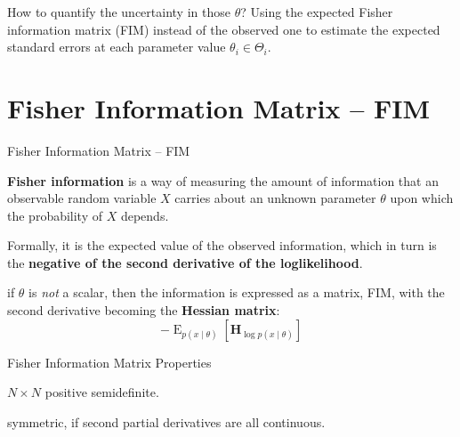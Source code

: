 \documentclass[aspectratio=169]{beamer}                    %
\begin{document}
\begin{frame}{How to quantify the uncertainty in those $\theta$?}
	Using the expected Fisher information matrix (FIM) instead of the
	observed one to estimate the expected standard errors at each parameter
	value $\theta_i \in \Theta_i$.
\end{frame}

\section{Fisher Information Matrix -- FIM}
\begin{frame}{Fisher Information Matrix -- FIM}
	\begin{vfilleditems}
		\item \textbf{Fisher information} is a way of measuring the amount of information that an observable
		random variable $X$ carries about an unknown parameter $\theta$
		upon which the probability of $X$ depends.
		\item Formally, it is the expected value of the observed information,
		which in turn is the \textbf{negative of the second derivative of the loglikelihood}.
		\item if $\theta$ is \textit{not} a scalar, then the information
		is expressed as a matrix, FIM, with the second derivative becoming
		the \textbf{Hessian matrix}:
		$$
			-\operatorname{E}_{p(x \mid \theta)} \left[ \mathbf{H}_{\log p(x \mid \theta)} \right]
		$$
	\end{vfilleditems}
\end{frame}

\begin{frame}{Fisher Information Matrix Properties}
	\begin{vfilleditems}
		\item $N \times N$ positive semidefinite.
		\item symmetric, if second partial derivatives are all continuous.
	\end{vfilleditems}
\end{frame}
\end{document}
